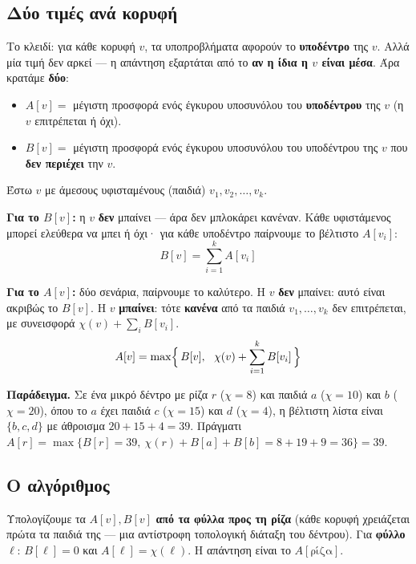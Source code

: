 \documentclass[11pt,a4paper]{article}
\begin{document}
\subsection{Δύο τιμές ανά κορυφή}

Το κλειδί: για κάθε κορυφή $v$, τα υποπροβλήματα αφορούν το \textbf{υποδέντρο}
της $v$. Αλλά μία τιμή δεν αρκεί --- η απάντηση εξαρτάται από το \textbf{αν η
ίδια η $v$ είναι μέσα}. Άρα κρατάμε \textbf{δύο}:

\begin{keypoint}
\begin{itemize}
  \item $A[v] = $ μέγιστη προσφορά ενός έγκυρου υποσυνόλου του \textbf{υποδέντρου}
  της $v$ (η $v$ επιτρέπεται ή όχι).
  \item $B[v] = $ μέγιστη προσφορά ενός έγκυρου υποσυνόλου του υποδέντρου της $v$
  που \textbf{δεν περιέχει} την $v$.
\end{itemize}
\end{keypoint}

Έστω $v$ με άμεσους υφισταμένους (παιδιά) $v_1, v_2, \dots, v_k$.

\textbf{Για το $B[v]$:} η $v$ \textbf{δεν} μπαίνει --- άρα δεν μπλοκάρει
κανέναν. Κάθε υφιστάμενος μπορεί ελεύθερα να μπει ή όχι· για κάθε υποδέντρο
παίρνουμε το βέλτιστο $A[v_i]$:
\[
B[v] = \sum_{i=1}^{k} A[v_i]
\]

\textbf{Για το $A[v]$:} δύο σενάρια, παίρνουμε το καλύτερο. Η $v$ \textbf{δεν}
μπαίνει: αυτό είναι ακριβώς το $B[v]$. Η $v$ \textbf{μπαίνει}: τότε
\textbf{κανένα} από τα παιδιά $v_1, \dots, v_k$ δεν επιτρέπεται, με συνεισφορά
$\chi(v) + \sum_i B[v_i]$.
\[
A[v] = \max\Bigl\{\, B[v],\ \ \chi(v) + \sum_{i=1}^{k} B[v_i] \,\Bigr\}
\]

\begin{notebox}
\textbf{Παράδειγμα.} Σε ένα μικρό δέντρο με ρίζα $r$ ($\chi = 8$) και παιδιά $a$
($\chi = 10$) και $b$ ($\chi = 20$), όπου το $a$ έχει παιδιά $c$ ($\chi = 15$)
και $d$ ($\chi = 4$), η βέλτιστη λίστα είναι $\{b, c, d\}$ με άθροισμα
$20 + 15 + 4 = 39$. Πράγματι $A[r] = \max\{B[r] = 39,\ \chi(r) + B[a] + B[b] =
8 + 19 + 9 = 36\} = 39$.
\end{notebox}

\subsection{Ο αλγόριθμος}

Υπολογίζουμε τα $A[v], B[v]$ \textbf{από τα φύλλα προς τη ρίζα} (κάθε κορυφή
χρειάζεται πρώτα τα παιδιά της --- μια αντίστροφη τοπολογική διάταξη του
δέντρου). Για \textbf{φύλλο} $\ell$: $B[\ell] = 0$ και $A[\ell] = \chi(\ell)$. Η
απάντηση είναι το $A[\text{ρίζα}]$.
\end{document}
